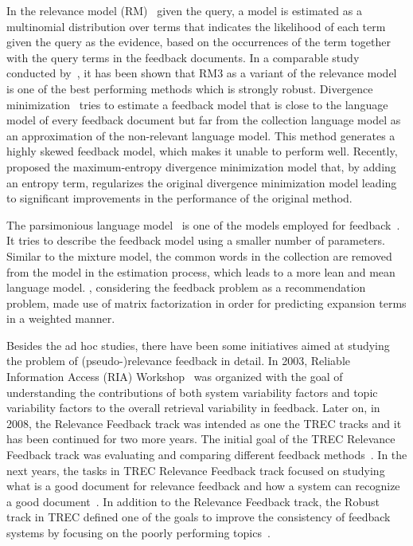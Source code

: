 In the relevance model (RM)~\citep{Abdul-jaleel:2004,Lavrenko:2001} given the query, a model is estimated as a multinomial distribution over terms that indicates the likelihood of each term given the query as the evidence, based on the occurrences of the term together with the query terms in the feedback documents.  In a comparable study conducted by~\citet{Zhai:SMM:2001}, it has been shown that RM3 as a variant of the relevance model is one of the best performing methods which is strongly robust.
Divergence minimization~\citep{Zhai:SMM:2001} tries to estimate a feedback model that is close to the language model of every feedback document but far from the collection language model as an approximation of the non-relevant language model. This method generates a highly skewed feedback model, which makes it unable to perform well. Recently, \citet{Lv:2014} proposed the maximum-entropy divergence minimization model that, by adding an entropy term, regularizes the original divergence minimization model leading to significant improvements in the performance of the original method.

The parsimonious language model~\citep{Hiemstra:2004} is one of the models employed for feedback~\citep{Meij:2008,Hiemstra:2008:TREC,Kaptein:2008:TREC}. It tries to describe the feedback model using a smaller number of parameters. Similar to the mixture model, the common words in the collection are removed from the model in the estimation process, which leads to a more lean and mean language model.  \citet{Zamani:2016a}, considering the feedback problem as a recommendation problem, made use of matrix factorization in order for predicting expansion terms in a weighted manner.

Besides the ad hoc studies, there have been some initiatives aimed at studying the problem of (pseudo-)relevance feedback in detail. In 2003, Reliable Information Access (RIA) Workshop~\citep{Harman:2009,Warren:2004} 
was organized with the goal of understanding the contributions of both system variability factors and topic variability factors to the overall retrieval variability in feedback. 
Later on, in 2008, the Relevance Feedback track was intended as one the TREC tracks and it has been continued for two more years. The initial goal of the TREC Relevance Feedback track was evaluating and comparing different feedback methods~\citep{Buckley:2008:TREC}. In the next years, the tasks in TREC Relevance Feedback track focused on studying what is a good document for relevance feedback and how a system can recognize a good document~\citep{Buckley:2010:TREC}. 
In addition to the Relevance Feedback track, the Robust track in TREC defined one of the goals to improve the consistency of feedback systems by focusing on the poorly performing topics~\citep{Voorhees:2003:TREC}.

